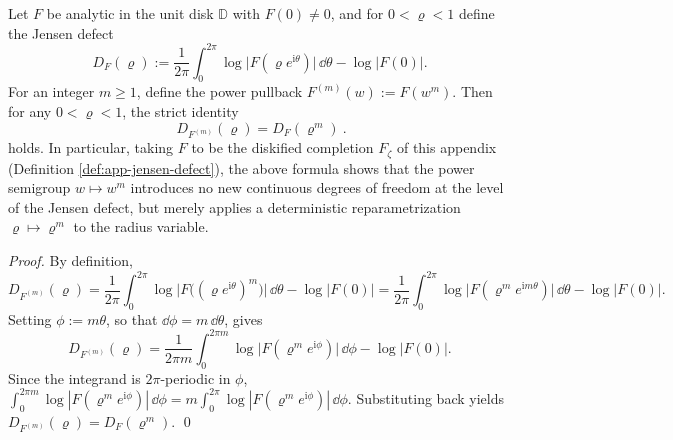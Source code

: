 \begin{proposition}\label{prop:app-jensen-defect-power-covariance}
Let \(F\) be analytic in the unit disk \(\mathbb{D}\) with \(F(0)\neq 0\), and for \(0<\varrho<1\) define the Jensen defect
\[
D_F(\varrho):=\frac{1}{2\pi}\int_{0}^{2\pi}\log\bigl|F(\varrho e^{\mathrm{i}\theta})\bigr|\,\dd\theta-\log|F(0)|.
\]
For an integer \(m\ge 1\), define the power pullback \(F^{(m)}(w):=F(w^m)\).
Then for any \(0<\varrho<1\), the strict identity
\begin{equation}\label{eq:app-jensen-defect-power-covariance}
\boxed{\ D_{F^{(m)}}(\varrho)=D_F(\varrho^m)\ }.
\end{equation}
holds. In particular, taking \(F\) to be the diskified completion \(F_{\zeta}\) of this appendix (Definition \ref{def:app-jensen-defect}), the above formula shows that the power semigroup \(w\mapsto w^m\) introduces no new continuous degrees of freedom at the level of the Jensen defect, but merely applies a deterministic reparametrization \(\varrho\mapsto \varrho^m\) to the radius variable.
\end{proposition}
\begin{proof}
By definition,
\[
D_{F^{(m)}}(\varrho)
=\frac{1}{2\pi}\int_{0}^{2\pi}\log\bigl|F\!\bigl((\varrho e^{\mathrm{i}\theta})^m\bigr)\bigr|\,\dd\theta-\log|F(0)|
=\frac{1}{2\pi}\int_{0}^{2\pi}\log\bigl|F(\varrho^m e^{\mathrm{i}m\theta})\bigr|\,\dd\theta-\log|F(0)|.
\]
Setting \(\phi:=m\theta\), so that \(\dd\phi=m\,\dd\theta\), gives
\[
D_{F^{(m)}}(\varrho)
=\frac{1}{2\pi m}\int_{0}^{2\pi m}\log\bigl|F(\varrho^m e^{\mathrm{i}\phi})\bigr|\,\dd\phi-\log|F(0)|.
\]
Since the integrand is \(2\pi\)-periodic in \(\phi\),
\(
\int_{0}^{2\pi m}\log|F(\varrho^m e^{\mathrm{i}\phi})|\,\dd\phi
=m\int_{0}^{2\pi}\log|F(\varrho^m e^{\mathrm{i}\phi})|\,\dd\phi
\).
Substituting back yields \(D_{F^{(m)}}(\varrho)=D_F(\varrho^m)\). \qed
\end{proof}

